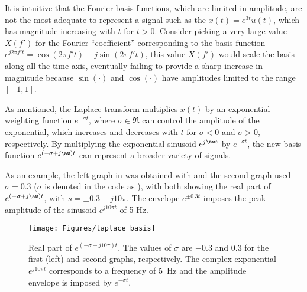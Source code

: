 It is intuitive that the Fourier basis functions, which are limited in amplitude, are not the most adequate to represent a signal such as the $x(t)= e^{3t} u(t)$, which has magnitude increasing with $t$ for $t>0$. Consider picking a very large value $X(f')$ for the Fourier ``coefficient'' corresponding to the basis function $e^{j 2 \pi f' t} = \cos(2 \pi f' t) + j \sin(2 \pi f' t)$, this value $X(f')$ would scale the basis along all the time axis, eventually failing to provide a sharp increase in magnitude because $\sin(\cdot)$ and $\cos(\cdot)$ have amplitudes limited to the range $[-1, 1]$.

As mentioned, the Laplace transform multiplies $x(t)$ by an exponential weighting function $e^{-\sigma t}$, where $\sigma \in \Re$  can control the amplitude of the exponential, which increases and decreases with $t$ for $\sigma < 0$ and $\sigma > 0$, respectively. By multiplying the exponential sinusoid $e^{j \aw t}$ by $e^{-\sigma t}$, the new basis function $e^{(-\sigma + j \aw) t}$ can represent
a broader variety of signals. 

As an example, the left graph in  was obtained with 
and the second graph used $\sigma =0.3$ ($\sigma$ is denoted in the code as ), with both showing the real part of $e^{(-\sigma + j \aw) t}$, with $s=\pm 0.3 + j 10 \pi$. The envelope $e^{\pm 0.3t}$ imposes the peak amplitude of the sinusoid $e^{j 10 \pi t}$ of 5 Hz.


\begin{figure}[!htb]
        \centering
                \texttt{[image: Figures/laplace\_basis]}               
        \caption[{Real part of $e^{(-\sigma + j 10 \pi)t}$. The values of $\sigma$ are $-0.3$ and 0.3 for the first (left) and second graphs, respectively.}]{Real part of $e^{(-\sigma + j 10 \pi)t}$. The values of $\sigma$ are $-0.3$ and 0.3 for the first (left) and second graphs, respectively. The complex exponential $e^{j 10 \pi t}$ corresponds to a frequency of 5~Hz and the amplitude envelope is imposed by $e^{-\sigma t}$.\label{fig:laplace_basis}}
\end{figure}

